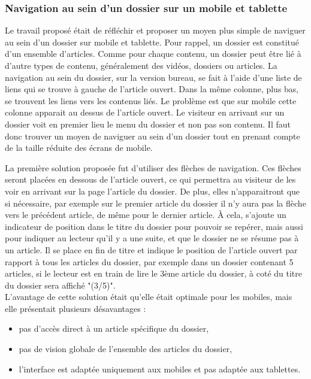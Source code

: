 \documentclass[12pt,a4paper]{article}
\begin{document}
\subsubsection{Navigation au sein d'un dossier sur un mobile et tablette}
Le travail proposé était de réfléchir et proposer un moyen plus simple de naviguer au sein d'un dossier sur mobile et tablette. Pour rappel, un dossier est constitué d'un ensemble d'articles. Comme pour chaque contenu, un dossier peut être lié à d'autre types de contenu, généralement des vidéos, dossiers ou articles. La navigation au sein du dossier, sur la version bureau, se fait à l'aide d'une liste de liens qui se trouve à gauche de l'article ouvert. Dans la même colonne, plus bas, se trouvent les liens vers les contenus liés. Le problème est que sur mobile cette colonne apparait au dessus de l'article ouvert. Le visiteur en arrivant sur un dossier voit en premier lieu le menu du dossier et non pas son contenu. Il faut donc trouver un moyen de naviguer au sein d'un dossier tout en prenant compte de la taille réduite des écrans de mobile.\par
La première solution proposée fut d'utiliser des flèches de navigation. Ces flèches seront placées en dessous de l'article ouvert, ce qui permettra au visiteur de les voir en arrivant sur la page l'article du dossier. De plus, elles n'apparaitront que si nécessaire, par exemple sur le premier article du dossier il n'y aura pas la flèche vers le précédent article, de même pour le dernier article. À cela, s'ajoute un indicateur de position dans le titre du dossier pour pouvoir se repérer, mais aussi pour indiquer au lecteur qu'il y a une suite, et que le dossier ne se résume pas à un article. Il se place en fin de titre et indique le position de l'article ouvert par rapport à tous les articles du dossier, par exemple dans un dossier contenant 5 articles, si le lecteur est en train de lire le 3ème article du dossier, à coté du titre du dossier sera affiché "(3/5)".\\
L'avantage de cette solution était qu'elle était optimale pour les mobiles, mais elle présentait plusieurs désavantages :
\begin{itemize}
\item pas d'accès direct à un article spécifique du dossier,
\item pas de vision globale de l'ensemble des articles du dossier,
\item l'interface est adaptée uniquement aux mobiles et pas adaptée aux tablettes.
\end{itemize}\par
\end{document}
